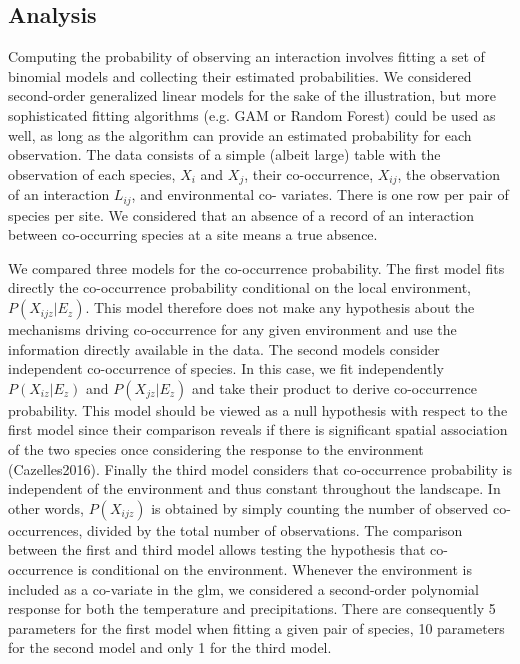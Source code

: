 \documentclass[12pt]{article}
\begin{document}
\subsection*{Analysis}  

Computing the probability of observing an interaction involves fitting a set
of binomial models and collecting their estimated probabilities. We considered
second-order generalized linear models for the sake of the illustration, but
more sophisticated fitting algorithms (e.g. GAM or Random Forest) could be
used as well, as long as the algorithm can provide an estimated probability
for each observation. The data consists of a simple (albeit large) table with
the observation of each species, $X_i$ and $X_j$, their co-occurrence,
$X_{ij}$, the observation of an interaction $L_{ij}$, and environmental co-
variates. There is one row per pair of species per site. We considered that an
absence of a record of an interaction between co-occurring species at a site
means a true absence.

We compared three models for the co-occurrence probability. The first model
fits directly the co-occurrence probability conditional
on the local environment, $P(X_{ijz}|E_z)$. This model therefore does not make any
hypothesis about the mechanisms driving co-occurrence for any given
environment and use the information directly available in the data. The second
models consider independent co-occurrence of species. In this case, we fit
independently $P(X_{iz}|E_z)$ and $P(X_{jz}|E_z)$ and take their product to
derive co-occurrence probability. This model should be viewed as a null
hypothesis with respect to the first model since their comparison reveals if
there is significant spatial association of the two species once considering
the response to the environment (Cazelles2016). Finally the third model
considers that co-occurrence probability is independent of the environment and
thus constant throughout the landscape.  In other words, $P(X_{ijz})$ is
obtained by simply counting the number of observed co-occurrences, divided by
the total number of observations. The comparison between the first and third
model allows testing the hypothesis that co-occurrence is conditional on the
environment. Whenever the environment is included as a co-variate in the glm,
we considered a second-order polynomial response for both the temperature and
precipitations. There are consequently 5 parameters for the first model when
fitting a given pair of species, 10 parameters for the second model and only 1
for the third model.
\end{document}
